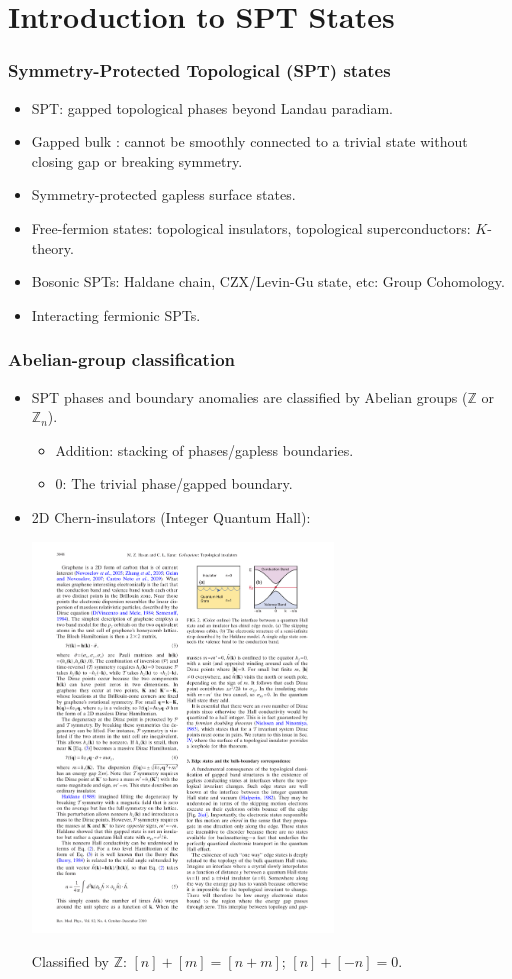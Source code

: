 \documentclass[xcolor=table, 11pt, aspectratio=169]{beamer}
\begin{document}
\section{Introduction to SPT States}

\begin{frame}
  \frametitle{Symmetry-Protected Topological (SPT) states}
\begin{itemize}
\item SPT: gapped topological phases beyond Landau paradiam.
\item Gapped bulk : cannot be smoothly connected to a trivial state without closing gap or breaking symmetry.
\item Symmetry-protected gapless surface states.
\item Free-fermion states: topological insulators, topological superconductors: $K$-theory.
\item Bosonic SPTs: Haldane chain, CZX/Levin-Gu state, etc: Group Cohomology.
\item Interacting fermionic SPTs.
\end{itemize}
\end{frame}

\begin{frame}
	\frametitle{Abelian-group classification}
	\begin{itemize}
		\item SPT phases and boundary anomalies are classified by Abelian groups ($\mathbb Z$ or $\mathbb Z_n$).
		\begin{itemize}
			\item Addition: stacking of phases/gapless boundaries.
			\item 0: The trivial phase/gapped boundary.
		\end{itemize}
		\item 2D Chern-insulators (Integer Quantum Hall):
		\begin{center}
				\includegraphics[width=8cm]{qhe_edge}
		\end{center}
		Classified by $\mathbb Z$: $[n]+[m]=[n+m]$; $[n]+[-n] = 0$.
	\end{itemize}
\end{frame}
\end{document}
